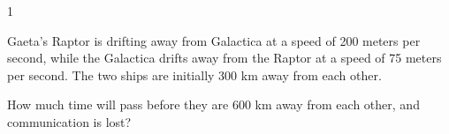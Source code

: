 
\AddToShipoutPicture*{\BackgroundPic}

\addtocounter {ProbNum} {1}

 
{\bf \Large{}} Gaeta's Raptor is drifting away from Galactica at a speed of 200 meters per second, while the Galactica drifts away from the Raptor at a speed of 75 meters per second.  The two ships are initially 300 km away from each other.

\bigskip

\indent  How much time will pass before they are 600 km away from each other, and communication is lost?

\vfill

\newpage
